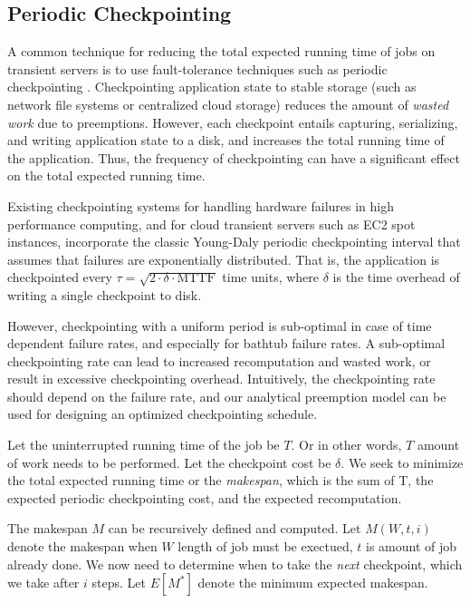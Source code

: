 


\subsection{Periodic Checkpointing}

A common technique for reducing the total expected running time of jobs on transient servers is to use fault-tolerance techniques such as periodic checkpointing \cite{flint}.
Checkpointing application state to stable storage (such as network file systems or centralized cloud storage) reduces the amount of \emph{wasted work} due to preemptions.
However, each checkpoint entails capturing, serializing, and writing application state to a disk, and increases the total running time of the application.
Thus, the frequency of checkpointing can have a significant effect on the total expected running time.

Existing checkpointing systems for handling hardware failures in high performance computing, and for cloud transient servers such as EC2 spot instances, incorporate the classic Young-Daly periodic checkpointing interval that assumes that failures are exponentially distributed. 
That is, the application is checkpointed every $\tau = \sqrt{2 \cdot \delta \cdot \text{MTTF}}$ time units, where $\delta$ is the time overhead of writing a single checkpoint to disk. 


However, checkpointing with a uniform period is sub-optimal in case of time dependent failure rates, and especially for bathtub failure rates.
A sub-optimal checkpointing rate can lead to increased recomputation and wasted work, or result in excessive checkpointing overhead. 
Intuitively, the checkpointing rate should depend on the failure rate, and our analytical preemption model can be used for designing an optimized checkpointing schedule. 

Let the uninterrupted running time of the job be $T$. Or in other words, $T$ amount of work needs to be performed. 
Let the checkpoint cost be $\delta$.
We seek to minimize the total expected running time or the \emph{makespan}, which is the sum of T, the expected periodic checkpointing cost, and the expected recomputation.

The makespan $M$ can be recursively defined and computed.
Let $M(W, t, i)$ denote the makespan when $W$ length of job must be exectued, $t$ is amount of job already done. %
We now need to determine when to take the \emph{next} checkpoint, which we take after $i$ steps. Let $E[M^*]$ denote the minimum expected makespan.


